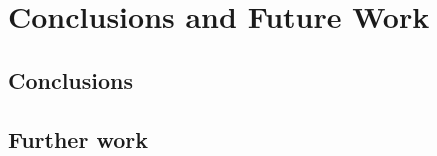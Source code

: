 \chapter{Conclusions and Future Work} \label{chap:summary}
\lipsum[20-25]

\section{Conclusions}
\lipsum[20-25]

\section{Further work}
\lipsum[20-25]